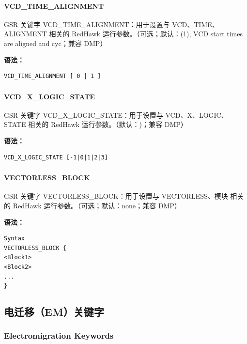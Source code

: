 \paragraph*{VCD_TIME_ALIGNMENT}

GSR 关键字 VCD_TIME_ALIGNMENT：用于设置与 VCD、TIME、ALIGNMENT 相关的 RedHawk 运行参数。（可选；默认：(1), VCD start times are aligned and cyc；兼容 DMP）

\textbf{语法：}
\begin{lstlisting}
VCD_TIME_ALIGNMENT [ 0 | 1 ]
\end{lstlisting}

\subsubsection{}
\paragraph*{VCD_X_LOGIC_STATE}

GSR 关键字 VCD_X_LOGIC_STATE：用于设置与 VCD、X、LOGIC、STATE 相关的 RedHawk 运行参数。（默认：)；兼容 DMP）

\textbf{语法：}
\begin{lstlisting}
VCD_X_LOGIC_STATE [-1|0|1|2|3]
\end{lstlisting}

\subsubsection{}
\paragraph*{VECTORLESS_BLOCK}

GSR 关键字 VECTORLESS_BLOCK：用于设置与 VECTORLESS、模块 相关的 RedHawk 运行参数。（可选；默认：none；兼容 DMP）

\textbf{语法：}
\begin{lstlisting}
Syntax
VECTORLESS_BLOCK {
<Block1>
<Block2>
...
}
\end{lstlisting}

\subsection{电迁移（EM）关键字}
\subsubsection*{Electromigration Keywords}

